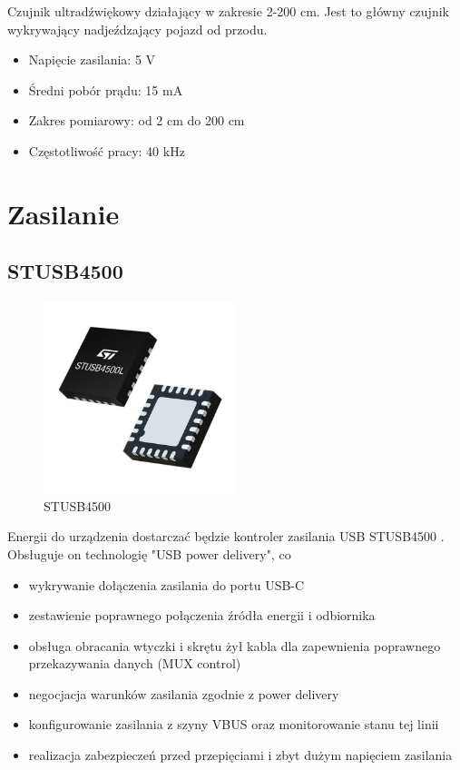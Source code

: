 \documentclass[12pt]{article}
\begin{document}
Czujnik ultradźwiękowy działający w zakresie 2-200 cm.
Jest to główny czujnik wykrywający nadjeźdzający pojazd od przodu.

\begin{itemize}
    \item Napięcie zasilania: 5 V
    \item Średni pobór prądu: 15 mA
    \item Zakres pomiarowy: od 2 cm do 200 cm
    \item Częstotliwość pracy: 40 kHz
\end{itemize}

\section{Zasilanie}
\subsection{STUSB4500}

\begin{figure}[H]
	\centering
	\includegraphics[width=0.5\textwidth]{figures/stusb.jpg}
	\caption{STUSB4500}
	\label{fig:stusb}
\end{figure}

Energii do urządzenia dostarczać będzie kontroler zasilania USB 
STUSB4500 \cite{STUSB4500f}. Obsługuje on technologię "USB power delivery", 
co 

\begin{itemize}
    \item wykrywanie dołączenia zasilania do portu USB-C
    \item zestawienie poprawnego połączenia źródła energii i odbiornika
    \item obsługa obracania wtyczki i skrętu żył kabla dla zapewnienia poprawnego przekazywania danych (MUX control)
    \item negocjacja warunków zasilania zgodnie z power delivery
    \item konfigurowanie zasilania z szyny VBUS oraz monitorowanie stanu tej linii
    \item realizacja zabezpieczeń przed przepięciami i zbyt dużym napięciem zasilania
\end{itemize}
\end{document}
